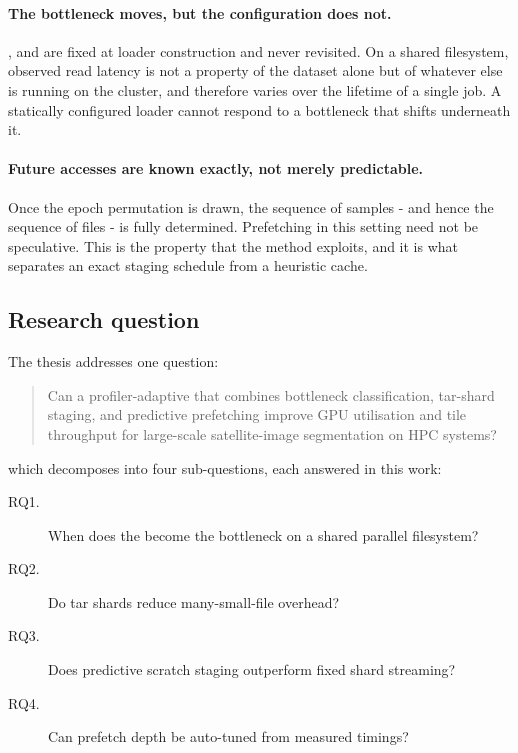 \paragraph{The bottleneck moves, but the configuration does not.}
,  and  are fixed at
loader construction and never revisited.
On a shared filesystem, observed read latency is not a property of the dataset
alone but of whatever else is running on the cluster, and therefore varies over the
lifetime of a single job.
A statically configured loader cannot respond to a bottleneck that shifts underneath it.

\paragraph{Future accesses are known exactly, not merely predictable.}
Once the epoch permutation is drawn, the sequence of samples - and hence the
sequence of files - is fully determined.
Prefetching in this setting need not be speculative.
This is the property that the method exploits, and it is what separates an exact
staging schedule from a heuristic cache.

\subsection{Research question}

The thesis addresses one question:

\begin{quote}
Can a profiler-adaptive  that combines bottleneck classification,
tar-shard staging, and predictive prefetching improve GPU utilisation and tile
throughput for large-scale satellite-image segmentation on HPC systems?
\end{quote}

which decomposes into four sub-questions, each answered in this work:

\begin{description}
  \item[RQ1.] When does the  become the bottleneck on a shared
    parallel filesystem?
  \item[RQ2.] Do tar shards reduce many-small-file overhead?
  \item[RQ3.] Does predictive scratch staging outperform fixed shard streaming?
  \item[RQ4.] Can prefetch depth be auto-tuned from measured timings?
\end{description}

